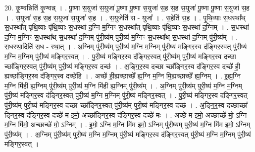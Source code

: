 \documentclass[17pt]{extarticle}
\begin{document}
20. कृ॒ण्वन्निति॑ कृ॒ण्वन्न् । . पू॒ष्णा स॒युजा॑ स॒युजा॑ पू॒ष्णा पू॒ष्णा स॒युजा॑ स॒ह स॒ह स॒युजा॑ पू॒ष्णा पू॒ष्णा स॒युजा॑ स॒ह । . स॒युजा॑ स॒ह स॒ह स॒युजा॑ स॒युजा॑ स॒ह । . स॒युजेति॑ स - युजा᳚ । . स॒हेति॑ स॒ह । . पृ॒थि॒व्याः स॒धस्था᳚थ् स॒धस्था᳚त् पृथि॒व्याः पृ॑थि॒व्याः स॒धस्था॑ द॒ग्नि म॒ग्निꣳ स॒धस्था᳚त् पृथि॒व्याः पृ॑थि॒व्याः स॒धस्था॑ द॒ग्निम् । . स॒धस्था॑ द॒ग्नि म॒ग्निꣳ स॒धस्था᳚थ् स॒धस्था॑ द॒ग्निम् पु॑री॒ष्य॑म् पुरी॒ष्य॑ म॒ग्निꣳ स॒धस्था᳚थ् स॒धस्था॑ द॒ग्निम् पु॑री॒ष्य᳚म् । . स॒धस्था॒दिति॑ स॒ध - स्था॒त् । . अ॒ग्निम् पु॑री॒ष्य॑म् पुरी॒ष्य॑ म॒ग्नि म॒ग्निम् पु॑री॒ष्य॑ मङ्गिर॒स्व द॑ङ्गिर॒स्वत् पु॑री॒ष्य॑ म॒ग्नि म॒ग्निम् पु॑री॒ष्य॑ मङ्गिर॒स्वत् । . पु॒री॒ष्य॑ मङ्गिर॒स्व द॑ङ्गिर॒स्वत् पु॑री॒ष्य॑म् पुरी॒ष्य॑ मङ्गिर॒स्व दच्छा च्छा᳚ङ्गिर॒स्वत् पु॑री॒ष्य॑म् पुरी॒ष्य॑ मङ्गिर॒स्व दच्छ॑ । . अ॒ङ्गि॒र॒स्व दच्छा च्छा᳚ङ्गिर॒स्व द॑ङ्गिर॒स्व दच्छे॑ ही॒ ह्यच्छा᳚ङ्गिर॒स्व द॑ङ्गिर॒स्व दच्छे॑हि । . अच्छे॑ ही॒ह्यच्छाच्छे᳚ ह्य॒ग्नि म॒ग्नि मि॒ह्यच्छाच्छे᳚ ह्य॒ग्निम् । . इ॒ह्य॒ग्नि म॒ग्नि मि॑ही ह्य॒ग्निम् पु॑री॒ष्य॑म् पुरी॒ष्य॑ म॒ग्नि मि॑ही ह्य॒ग्निम् पु॑री॒ष्य᳚म् । . अ॒ग्निम् पु॑री॒ष्य॑म् पुरी॒ष्य॑ म॒ग्नि म॒ग्निम् पु॑री॒ष्य॑ मङ्गिर॒स्व द॑ङ्गिर॒स्वत् पु॑री॒ष्य॑ म॒ग्नि म॒ग्निम् पु॑री॒ष्य॑ मङ्गिर॒स्वत् । . पु॒री॒ष्य॑ मङ्गिर॒स्व द॑ङ्गिर॒स्वत् पु॑री॒ष्य॑म् पुरी॒ष्य॑ मङ्गिर॒स्व दच्छा च्छा᳚ङ्गिर॒स्वत् पु॑री॒ष्य॑म् पुरी॒ष्य॑ मङ्गिर॒स्व दच्छ॑ । . अ॒ङ्गि॒र॒स्व दच्छाच्छा᳚ ङ्गिर॒स्व द॑ङ्गिर॒स्व दच्छे॑ म इमो॒ अच्छा᳚ङ्गिर॒स्व द॑ङ्गिर॒स्व दच्छे॑ मः । . अच्छे॑ म इमो॒ अच्छाच्छे॑ मो॒ ऽग्नि म॒ग्नि मि॑मो॒ अच्छाच्छे॑ मो॒ ऽग्निम् । . इ॒मो॒ ऽग्नि म॒ग्नि मि॑म इमो॒ ऽग्निम् पु॑री॒ष्य॑म् पुरी॒ष्य॑ म॒ग्नि मि॑म इमो॒ ऽग्निम् पु॑री॒ष्य᳚म् । . अ॒ग्निम् पु॑री॒ष्य॑म् पुरी॒ष्य॑ म॒ग्नि म॒ग्निम् पु॑री॒ष्य॑ मङ्गिर॒स्व द॑ङ्गिर॒स्वत् पु॑री॒ष्य॑ म॒ग्नि म॒ग्निम् पु॑री॒ष्य॑ मङ्गिर॒स्वत् । \newline
\end{document}
